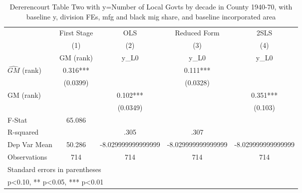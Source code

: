 \begin{table}[htbp]\centering
\def\sym#1{\ifmmode^{#1}\else\(^{#1}\)\fi}
\caption{Dererencourt Table Two with y=Number of Local Govts by decade in County 1940-70, with baseline y, division FEs, mfg and black mig share, and baseline incorporated area}
\begin{tabular}{l*{4}{c}}
\toprule
                    & First Stage   &         OLS   &Reduced Form   &        2SLS   \\
                    &\multicolumn{1}{c}{(1)}&\multicolumn{1}{c}{(2)}&\multicolumn{1}{c}{(3)}&\multicolumn{1}{c}{(4)}\\
                    &\multicolumn{1}{c}{GM  (rank)}&\multicolumn{1}{c}{y\_L0}&\multicolumn{1}{c}{y\_L0}&\multicolumn{1}{c}{y\_L0}\\
\midrule
$\hat{GM}$ (rank)   &       0.316***&               &       0.111***&               \\
                    &    (0.0399)   &               &    (0.0328)   &               \\
\addlinespace
GM  (rank)          &               &       0.102***&               &       0.351***\\
                    &               &    (0.0349)   &               &     (0.103)   \\
\midrule
F-Stat              &      65.086   &               &               &               \\
R-squared           &               &        .305   &        .307   &               \\
Dep Var Mean        &      50.286   &-8.029999999999999   &-8.029999999999999   &-8.029999999999999   \\
Observations        &         714   &         714   &         714   &         714   \\
\bottomrule
\multicolumn{5}{l}{\footnotesize Standard errors in parentheses}\\
\multicolumn{5}{l}{\footnotesize * p<0.10, ** p<0.05, *** p<0.01}\\
\end{tabular}
\end{table}
